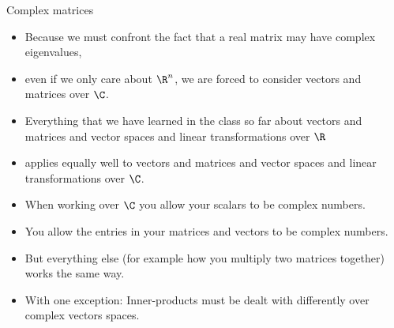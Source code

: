 \documentclass{beamer}
\begin{document}
\begin{frame}{Complex matrices}

\begin{itemize}
\item Because we must confront the fact that a real matrix may have complex eigenvalues,
\item even if we only care about $\R^n$, we are forced to consider vectors and matrices over $\C$.
\item Everything that we have learned in the class so far about vectors and matrices and vector spaces and linear transformations over $\R$
\item applies equally well to vectors and matrices and vector spaces and linear transformations over $\C$.
\item When working over $\C$ you allow your scalars to be complex numbers.
\item You allow the entries in your matrices and vectors to be complex numbers.
\item But everything else (for example how you multiply two matrices together) works the same way.
\item With one exception: Inner-products must be dealt with differently over
complex vectors spaces.
\end{itemize}
\end{frame}
\end{document}
